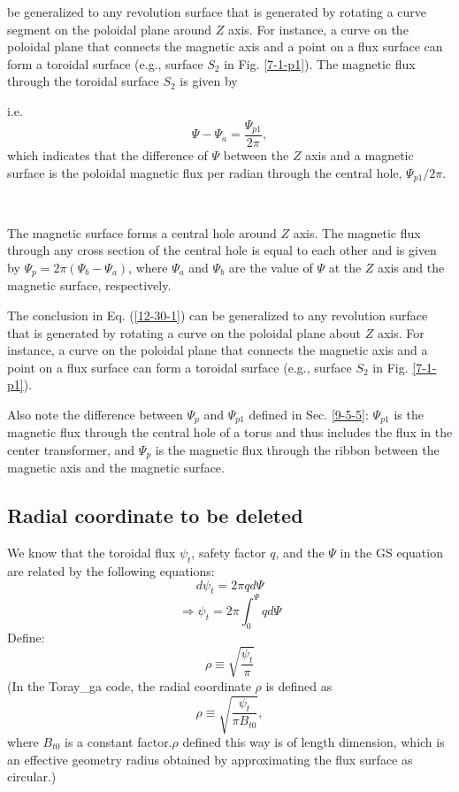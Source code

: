 \documentclass{llncs}
\begin{document}
be generalized to any revolution surface that is generated by rotating a curve
segment on the poloidal plane around $Z$ axis. For instance, a curve on the
poloidal plane that connects the magnetic axis and a point on a flux surface
can form a toroidal surface (e.g., surface $S_2$ in Fig. \ref{7-1-p1}). The
magnetic flux through the toroidal surface $S_2$ is given by

i.e.
\begin{equation}
  \Psi - \Psi_a = \frac{\Psi_{p 1}}{2 \pi},
\end{equation}
which indicates that the difference of $\Psi$ between the $Z$ axis and a
magnetic surface is the poloidal magnetic flux per radian through the central
hole, $\Psi_{p 1} / 2 \pi$.

\

The magnetic surface forms a central hole around $Z$ axis. The magnetic flux
through any cross section of the central hole is equal to each other and is
given by $\Psi_p = 2 \pi (\Psi_b - \Psi_a)$, where $\Psi_a$ and $\Psi_b$ are
the value of $\Psi$ at the $Z$ axis and the magnetic surface, respectively.

The conclusion in Eq. (\ref{12-30-1}) can be generalized to any revolution
surface that is generated by rotating a curve on the poloidal plane about $Z$
axis. For instance, a curve on the poloidal plane that connects the magnetic
axis and a point on a flux surface can form a toroidal surface (e.g., surface
$S_2$ in Fig. \ref{7-1-p1}).

Also note the difference between $\Psi_p$ and $\Psi_{p 1}$ defined in Sec.
\ref{9-5-5}: $\Psi_{p 1}$ is the magnetic flux through the central hole of a
torus and thus includes the flux in the center transformer, and $\Psi_p$ is
the magnetic flux through the ribbon between the magnetic axis and the
magnetic surface.

\subsection{Radial coordinate to be deleted}

We know that the toroidal flux $\psi_t$, safety factor $q$, and the $\Psi$ in
the GS equation are related by the following equations:
\begin{equation}
  d \psi_t = 2 \pi q d \Psi
\end{equation}
\begin{equation}
  \Longrightarrow \psi_t = 2 \pi \int_0^{\Psi} q d \Psi
\end{equation}
Define:
\begin{equation}
  \label{5-26-1} \rho \equiv \sqrt{\frac{\psi_t}{\pi}}
\end{equation}
(In the Toray\_ga code, the radial coordinate $\rho$ is defined as
\begin{equation}
  \label{3-21-a1} \rho \equiv \sqrt{\frac{\psi_t}{\pi B_{t 0}}},
\end{equation}
where $B_{t 0}$ is a constant factor.$\rho$ defined this way is of length
dimension, which is an effective geometry radius obtained by approximating the
flux surface as circular.)
\end{document}

